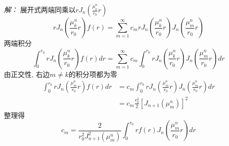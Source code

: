 \emph{解：}
	展开式两端同乘以$r J_n(\frac{\mu_k ^n}{r_0} r)$
	\begin{equation*}
		r J_n(\frac{\mu_k ^n}{r_0} r) f(r)=\sum_{m=1}^\infty c_m r J_n(\frac{\mu_k ^n}{r_0} r) J_n(\frac{\mu_m ^n}{r_0} r)
	\end{equation*}
	两端积分
	\begin{equation*}
		\int_0 ^{r_0}  r J_n(\frac{\mu_k ^n}{r_0} r) f(r) dr=\sum_{m=1}^\infty c_m \int_0 ^{r_0}  r J_n(\frac{\mu_k ^n}{r_0} r) J_n(\frac{\mu_m ^n}{r_0} r) dr
	\end{equation*}
	由正交性, 右边$m \ne k $的积分项都为零
	\begin{equation*}
		\begin{aligned}
			\int_0 ^{r_0}  r J_n(\frac{\mu_m ^n}{r_0} r) f(r) dr &= c_m \int_0 ^{r_0}  r J_n(\frac{\mu_m ^n}{r_0} r) J_n(\frac{\mu_m ^n}{r_0} r) dr \\ 
			&= c_m \frac{r_0^2}{2} [J_{n+1}(\mu_m ^n)]^2 
		\end{aligned}
	\end{equation*}
	整理得
	\begin{equation*}
		c_m=\frac{2} {r^2_0 J_{n+1} ^2 (\mu_m ^n)} \int_0 ^{r_0} r f(r) J_n (\frac{\mu_m ^n}{r_0} r)  dr 
	\end{equation*}	

~~\\ 

